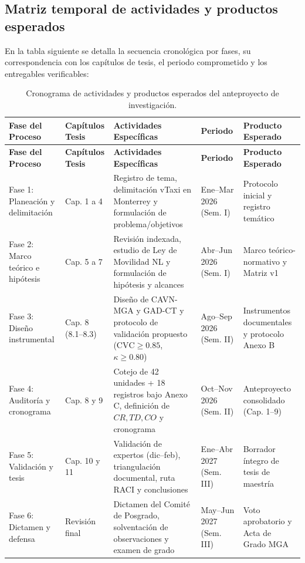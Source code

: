 {\subsection{Matriz temporal de actividades y productos esperados}
En la tabla siguiente se detalla la secuencia cronológica por fases, su correspondencia con los capítulos de tesis, el periodo comprometido y los entregables verificables:

\begin{center}
\begingroup\fontsize{8.5}{10.5}\selectfont
\renewcommand{\arraystretch}{1.25}
\setlength{\tabcolsep}{3pt}
\begin{longtable}{@{}p{2.7cm}p{1.9cm}p{3.9cm}p{2.2cm}p{2.9cm}@{}}
\caption{Cronograma de actividades y productos esperados del anteproyecto de investigación.}\\
\toprule
\textbf{Fase del Proceso} & \textbf{Capítulos Tesis} & \textbf{Actividades Específicas} & \textbf{Periodo} & \textbf{Producto Esperado} \\
\midrule
\endfirsthead
\toprule
\textbf{Fase del Proceso} & \textbf{Capítulos Tesis} & \textbf{Actividades Específicas} & \textbf{Periodo} & \textbf{Producto Esperado} \\
\midrule
\endhead
Fase 1: Planeación y delimitación & Cap. 1 a 4 & Registro de tema, delimitación vTaxi en Monterrey y formulación de problema/objetivos & Ene--Mar 2026 (Sem. I) & Protocolo inicial y registro temático \\
\midrule
Fase 2: Marco teórico e hipótesis & Cap. 5 a 7 & Revisión indexada, estudio de Ley de Movilidad NL y formulación de hipótesis y alcances & Abr--Jun 2026 (Sem. I) & Marco teórico-normativo y Matriz v1 \\
\midrule
Fase 3: Diseño instrumental & Cap. 8 (8.1--8.3) & Diseño de CAVN-MGA y GAD-CT y protocolo de validación propuesto ($\text{CVC}\ge 0.85$, $\kappa\ge 0.80$) & Ago--Sep 2026 (Sem. II) & Instrumentos documentales y protocolo Anexo B \\
\midrule
Fase 4: Auditoría y cronograma & Cap. 8 y 9 & Cotejo de 42 unidades + 18 registros bajo Anexo C, definición de $CR, TD, CO$ y cronograma & Oct--Nov 2026 (Sem. II) & Anteproyecto consolidado (Cap. 1--9) \\
\midrule
Fase 5: Validación y tesis & Cap. 10 y 11 & Validación de expertos (dic--feb), triangulación documental, ruta RACI y conclusiones & Ene--Abr 2027 (Sem. III) & Borrador íntegro de tesis de maestría \\
\midrule
Fase 6: Dictamen y defensa & Revisión final & Dictamen del Comité de Posgrado, solventación de observaciones y examen de grado & May--Jun 2027 (Sem. III) & Voto aprobatorio y Acta de Grado MGA \\
\bottomrule
\end{longtable}
\endgroup
\end{center}

}
